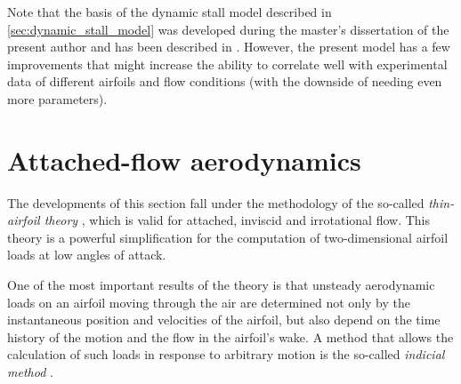 \documentclass[12pt,a4paper,oneside,english]{abntex2} %
\begin{document}
Note that the basis of the dynamic stall model described in \cref{sec:dynamic_stall_model} was developed during the master's dissertation of the present author and has been described in . However, the present model has a few improvements that might increase the ability to correlate well with experimental data of different airfoils and flow conditions (with the downside of needing even more parameters).

\section{Attached-flow aerodynamics}
\label{sec:attached_aero}

The developments of this section fall under the methodology of the so-called \textit{thin-airfoil theory} \cite{fung1993introduction,leishman2006principles}, which is valid for attached, inviscid and irrotational flow. This theory is a powerful simplification for the computation of two-dimensional airfoil loads at low angles of attack.

One of the most important results of the theory is that unsteady aerodynamic loads on an airfoil moving through the air are determined not only by the instantaneous position and velocities of the airfoil, but also depend on the time history of the motion and the flow in the airfoil's wake. A method that allows the calculation of such loads in response to arbitrary motion is the so-called \textit{indicial method} \cite{leishman2006principles}.
\end{document}
